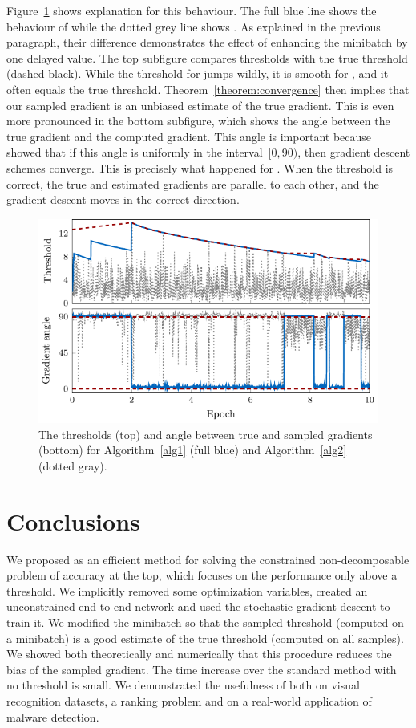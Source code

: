 Figure~\ref{fig:thresholds2} shows explanation for this behaviour. The full blue line shows the behaviour of \DeepTopPush while the dotted grey line shows \PatMatNP. As explained in the previous paragraph, their difference demonstrates the effect of enhancing the minibatch by one delayed value. The top subfigure compares thresholds with the true threshold (dashed black). While the threshold for \PatMatNP jumps wildly, it is smooth for \DeepTopPush, and it often equals the true threshold. Theorem~\ref{theorem:convergence} then implies that our sampled gradient is an unbiased estimate of the true gradient. This is even more pronounced in the bottom subfigure, which shows the angle between the true gradient and the computed gradient. This angle is important because~\cite{nocedal2006numerical} showed that if this angle is uniformly in the interval~$[0,90)$, then gradient descent schemes converge. This is precisely what happened for \DeepTopPush. When the threshold is correct, the true and estimated gradients are parallel to each other, and the gradient descent moves in the correct direction.

\begin{figure}[!ht]
  \centering
  \includegraphics[width = \linewidth]{images/deep_thresholds.pdf}
  \caption{The thresholds (top) and angle between true and sampled gradients (bottom) for Algorithm~\ref{alg1} (full blue) and Algorithm~\ref{alg2} (dotted gray).}
  \label{fig:thresholds2}
\end{figure}

\section{Conclusions}

We proposed \DeepTopPush as an efficient method for solving the constrained non-decomposable problem of accuracy at the top, which focuses on the performance only above a threshold. We implicitly removed some optimization variables, created an unconstrained end-to-end network and used the stochastic gradient descent to train it. We modified the minibatch so that the sampled threshold (computed on a minibatch) is a good estimate of the true threshold (computed on all samples). We showed both theoretically and numerically that this procedure reduces the bias of the sampled gradient. The time increase over the standard method with no threshold is small. We demonstrated the usefulness of \DeepTopPush both on visual recognition datasets, a ranking problem and on a real-world application of malware detection.
